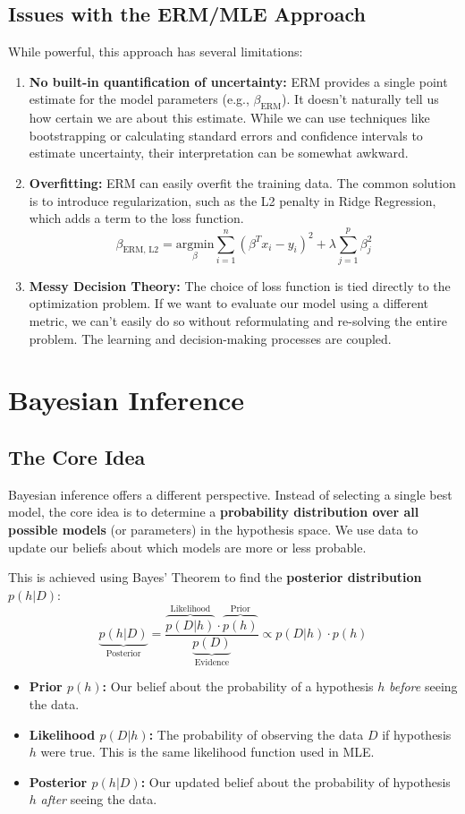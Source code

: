 \documentclass{article}
\begin{document}
\begin{multicols}{2}
	\subsection{Issues with the ERM/MLE Approach}
	While powerful, this approach has several limitations:
	\begin{enumerate}
		\item \textbf{No built-in quantification of uncertainty:} ERM provides a single point estimate for the model parameters (e.g., $\beta_{\text{ERM}}$). It doesn't naturally tell us how certain we are about this estimate. While we can use techniques like bootstrapping or calculating standard errors and confidence intervals to estimate uncertainty, their interpretation can be somewhat awkward.
		\item \textbf{Overfitting:} ERM can easily overfit the training data. The common solution is to introduce regularization, such as the L2 penalty in Ridge Regression, which adds a term to the loss function.
		      $$ \beta_{\text{ERM, L2}} = \underset{\beta}{\text{argmin}} \sum_{i=1}^{n} (\beta^T x_i - y_i)^2 + \lambda \sum_{j=1}^{p} \beta_j^2 $$
		\item \textbf{Messy Decision Theory:} The choice of loss function is tied directly to the optimization problem. If we want to evaluate our model using a different metric, we can't easily do so without reformulating and re-solving the entire problem. The learning and decision-making processes are coupled.
	\end{enumerate}

	\section{Bayesian Inference}
	\subsection{The Core Idea}
	Bayesian inference offers a different perspective. Instead of selecting a single best model, the core idea is to determine a \textbf{probability distribution over all possible models} (or parameters) in the hypothesis space. We use data to update our beliefs about which models are more or less probable.

	This is achieved using Bayes' Theorem to find the \textbf{posterior distribution} $p(h|D)$:
	$$ \underbrace{p(h|D)}_{\text{Posterior}} = \frac{\overbrace{p(D|h)}^{\text{Likelihood}} \cdot \overbrace{p(h)}^{\text{Prior}}}{\underbrace{p(D)}_{\text{Evidence}}} \propto p(D|h) \cdot p(h) $$
	\begin{itemize}
		\item \textbf{Prior $p(h)$:} Our belief about the probability of a hypothesis $h$ \textit{before} seeing the data.
		\item \textbf{Likelihood $p(D|h)$:} The probability of observing the data $D$ if hypothesis $h$ were true. This is the same likelihood function used in MLE.
		\item \textbf{Posterior $p(h|D)$:} Our updated belief about the probability of hypothesis $h$ \textit{after} seeing the data.
	\end{itemize}


\end{multicols}
\end{document}

